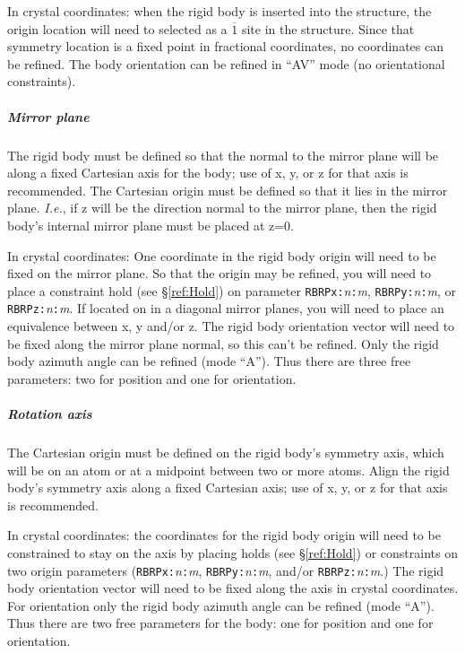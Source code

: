 In crystal coordinates: when the rigid body is inserted into the structure, the origin location will need to selected as a $\overline{1}$ site in the structure. 
Since that symmetry location is a fixed point in fractional coordinates, no coordinates can be refined. The body orientation can be refined in ``AV'' mode (no orientational constraints).

\subparagraph{Mirror plane} The rigid body must be defined so that the normal to the mirror plane will be along a fixed Cartesian axis for the body; use of x, y, or z for that axis is recommended. 
The Cartesian origin must be defined so that it lies in the mirror plane. \textit{I.e.}, if z will be the direction normal to the mirror plane, then the rigid body's internal mirror plane must be placed at z=0.

In crystal coordinates: One coordinate in the rigid body origin will need to be fixed on the mirror plane. So that the origin may be refined, you will need to place a constraint hold (see \S\ref{ref:Hold}) on parameter \texttt{RBRPx:}\textit{n}\texttt{:}\textit{m}, \texttt{RBRPy:}\textit{n}\texttt{:}\textit{m}, or \texttt{RBRPz:}\textit{n}\texttt{:}\textit{m}. If located on in a diagonal mirror planes, you will need to place an equivalence between x, y and/or z.   The rigid body orientation vector will need to be fixed along the mirror plane normal, so this can't be refined. Only the rigid body azimuth angle can be refined (mode ``A''). Thus there are three free parameters: two for position and one for orientation.  

\subparagraph{Rotation axis} The Cartesian origin must be defined on the rigid body's symmetry axis, which will be on an atom or at a midpoint between two or more atoms. Align the rigid body's symmetry axis along a fixed Cartesian axis;  use of x, y, or z for that axis is recommended. 

In crystal coordinates: the coordinates for the rigid body origin will need to be constrained to stay on the axis by placing holds (see \S\ref{ref:Hold})  or constraints on two origin parameters (\texttt{RBRPx:}\textit{n}\texttt{:}\textit{m}, \texttt{RBRPy:}\textit{n}\texttt{:}\textit{m}, and/or \texttt{RBRPz:}\textit{n}\texttt{:}\textit{m}.) The rigid body orientation vector will need to be fixed along the axis in crystal coordinates. For orientation only the rigid body azimuth angle can be refined (mode ``A''). 
Thus there are two free parameters for the body: one for position and one for orientation.  

